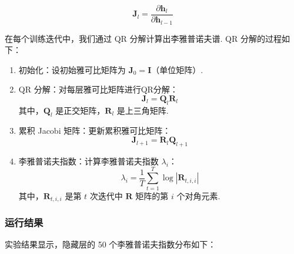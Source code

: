 \[
\mathbf{J}_l = \frac{\partial \mathbf{h}_l}{\partial \mathbf{h}_{l-1}}
\]

在每个训练迭代中，我们通过 QR 分解计算出李雅普诺夫谱. QR 分解的过程如下：

\begin{enumerate}
\item 初始化：设初始雅可比矩阵为 \(\mathbf{J}_0 = \mathbf{I}\)（单位矩阵）. 
\item QR 分解：对每层雅可比矩阵进行QR分解：
   \[
   \mathbf{J}_l = \mathbf{Q}_l \mathbf{R}_l
   \]
   其中，\(\mathbf{Q}_l\) 是正交矩阵，\(\mathbf{R}_l\) 是上三角矩阵. 
\item 累积 Jacobi 矩阵：更新累积雅可比矩阵：
   \[
   \mathbf{J}_{l+1} = \mathbf{R}_l \mathbf{Q}_{l+1}
   \]
\item 李雅普诺夫指数：计算李雅普诺夫指数 \(\lambda_i\)：
   \[
   \lambda_i = \frac{1}{T} \sum_{t=1}^T \log |\mathbf{R}_{t,i,i}|
   \]
   其中，\(\mathbf{R}_{t,i,i}\) 是第 \(t\) 次迭代中 \(\mathbf{R}\) 矩阵的第 \(i\) 个对角元素. 
\end{enumerate}

\subsubsection{运行结果}

实验结果显示，隐藏层的 50 个李雅普诺夫指数分布如下：

